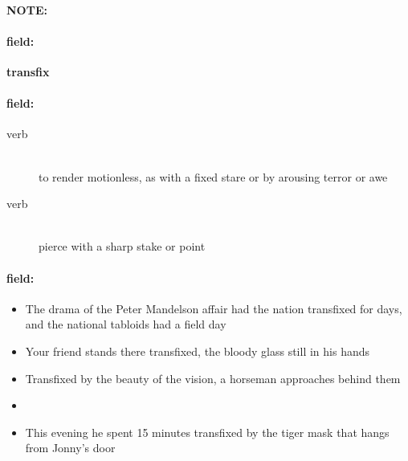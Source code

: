 \documentclass[12pt]{article}
\newenvironment{note}{\paragraph{NOTE:}}{}
\newenvironment{field}{\paragraph{field:}}{}
\begin{document}
\begin{note}
\begin{field}
\textbf{\large transfix}
\end{field}


\begin{field}
\begin{description}
\item[verb] \hfill \\ 
to render motionless, as with a fixed stare or by arousing terror or awe

\item[verb] \hfill \\ 
pierce with a sharp stake or point

\end{description}
\end{field}

\begin{field}
\begin{itemize}
\item The drama of the Peter Mandelson affair had the nation transfixed for days, and the national tabloids had a field day
\item Your friend stands there transfixed, the bloody glass still in his hands
\item Transfixed by the beauty of the vision, a horseman approaches behind them
\item 
\item This evening he spent 15 minutes transfixed by the tiger mask that hangs from Jonny's door
\end{itemize}
\end{field}
\end{note}
\end{document}
